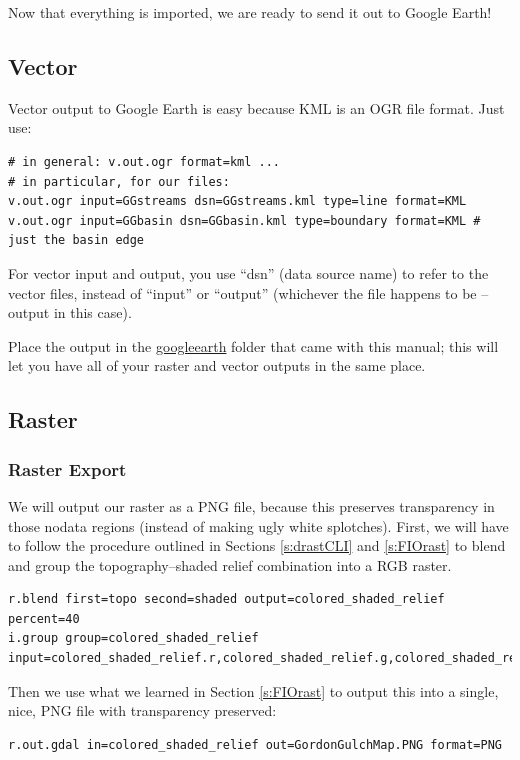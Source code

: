 \documentclass{book}
\begin{document}
Now that everything is imported, we are ready to send it out to Google Earth!

\subsection{Vector}

Vector output to Google Earth is easy because KML is an OGR file format. Just use:
\begin{lstlisting}
# in general: v.out.ogr format=kml ...
# in particular, for our files:
v.out.ogr input=GGstreams dsn=GGstreams.kml type=line format=KML 
v.out.ogr input=GGbasin dsn=GGbasin.kml type=boundary format=KML # just the basin edge
\end{lstlisting}
For vector input and output, you use ``dsn'' (data source name) to refer to the vector files, instead of ``input'' or ``output'' (whichever the file happens to be -- output in this case).

Place the output in the \url{googleearth} folder that came with this manual; this will let you have all of your raster and vector outputs in the same place.

\subsection{Raster}

\subsubsection{Raster Export}

We will output our raster as a PNG file, because this preserves transparency in those nodata regions (instead of making ugly white splotches). First, we will have to follow the procedure outlined in Sections \ref{s:drastCLI} and \ref{s:FIOrast} to blend and group the topography--shaded relief combination into a RGB raster.
\begin{lstlisting}
r.blend first=topo second=shaded output=colored_shaded_relief percent=40
i.group group=colored_shaded_relief input=colored_shaded_relief.r,colored_shaded_relief.g,colored_shaded_relief.b
\end{lstlisting}

Then we use what we learned in Section \ref{s:FIOrast} to output this into a single, nice, PNG file with transparency preserved:
\begin{lstlisting}
r.out.gdal in=colored_shaded_relief out=GordonGulchMap.PNG format=PNG
\end{lstlisting}
\end{document}
